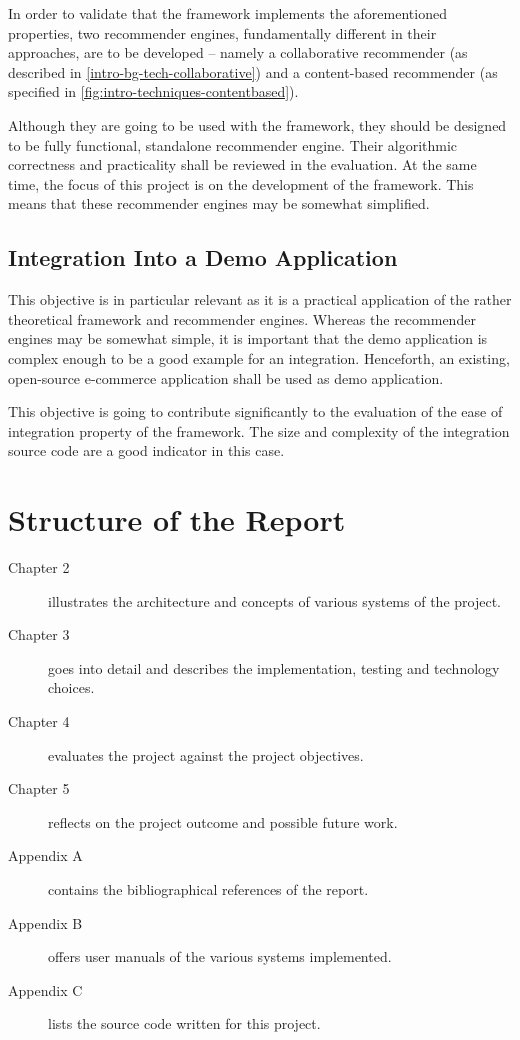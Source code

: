 In order to validate that the framework implements the aforementioned properties, two recommender engines, fundamentally different in their approaches, are to be developed -- namely a collaborative recommender (as described in \ref{intro-bg-tech-collaborative}) and a content-based recommender (as specified in \ref{fig:intro-techniques-contentbased}).

Although they are going to be used with the framework, they should be designed to be fully functional, standalone recommender engine. Their algorithmic correctness and practicality shall be reviewed in the evaluation. At the same time, the focus of this project is on the development of the framework. This means that these recommender engines may be somewhat simplified.

\subsection{Integration Into a Demo Application}
\label{intro-objectives-demo}

This objective is in particular relevant as it is a practical application of the rather theoretical framework and recommender engines. Whereas the recommender engines may be somewhat simple, it is important that the demo application is complex enough to be a good example for an integration. Henceforth, an existing, open-source e-commerce application shall be used as demo application.

This objective is going to contribute significantly to the evaluation of the ease of integration property of the framework. The size and complexity of the integration source code are a good indicator in this case.

\section{Structure of the Report}

\begin{description}
    \item[Chapter 2] illustrates the architecture and concepts of various systems of the project.
    \item[Chapter 3] goes into detail and describes the implementation, testing and technology choices.
    \item[Chapter 4] evaluates the project against the project objectives.
    \item[Chapter 5] reflects on the project outcome and possible future work.
    \item[Appendix A] contains the bibliographical references of the report.
    \item[Appendix B] offers user manuals of the various systems implemented.
    \item[Appendix C] lists the source code written for this project.
\end{description}